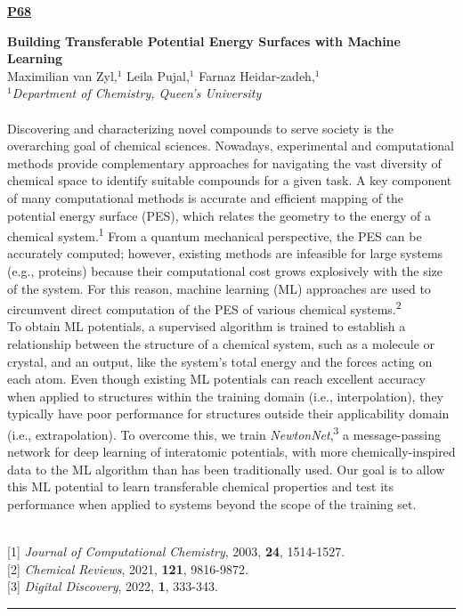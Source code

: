\documentclass[titlepage,oneside,openany,10pt]{book}
\newenvironment{posterabswref}[5] %
        {
        \newcommand{\posterref}{#5}
	\begin{flushright}
                \underline{\textbf{#4}}
        \end{flushright}
        \textbf{#1}\\%
        #2\\%
        \textit{#3}\\\\%
        }
        {
        \vspace{0.5cm}
        \\\noindent \posterref \\ \noindent\rule{15cm}{0.5pt}%
        }
\begin{document}
\newpage

\begin{posterabswref}
	{Building Transferable Potential Energy Surfaces with Machine Learning}
	{Maximilian van Zyl,$^{1}$ Leila Pujal,$^{1}$ Farnaz Heidar-zadeh,$^{1}$}
	{
	$^1$Department of Chemistry, Queen's University
	}
	{P68}
	{
	{[1]} \emph{Journal of Computational Chemistry}, 2003, \textbf{24}, 1514-1527.\\
	{[2]} \emph{Chemical Reviews}, 2021, \textbf{121}, 9816-9872.\\
	{[3]} \emph{Digital Discovery}, 2022, \textbf{1}, 333-343.
	}
	Discovering and characterizing novel compounds to serve society is the overarching goal of chemical sciences. Nowadays, experimental and computational methods provide complementary approaches for navigating the vast diversity of chemical space to identify suitable compounds for a given task. A key component of many computational methods is accurate and efficient mapping of the potential energy surface (PES), which relates the geometry to the energy of a chemical system.\textsuperscript{1} From a quantum mechanical perspective, the PES can be accurately computed; however, existing methods are infeasible for large systems (e.g., proteins) because their computational cost grows explosively with the size of the system. For this reason, machine learning (ML) approaches are used to circumvent direct computation of the PES of various chemical systems.\textsuperscript{2}\\To obtain ML potentials, a supervised algorithm is trained to establish a relationship between the structure of a chemical system, such as a molecule or crystal, and an output, like the system's total energy and the forces acting on each atom. Even though existing ML potentials can reach excellent accuracy when applied to structures within the training domain (i.e., interpolation), they typically have poor performance for structures outside their applicability domain (i.e., extrapolation). To overcome this, we train \emph{NewtonNet},\textsuperscript{3} a message-passing network for deep learning of interatomic potentials, with more chemically-inspired data to the ML algorithm than has been traditionally used. Our goal is to allow this ML potential to learn transferable chemical properties and test its performance when applied to systems beyond the scope of the training set.
	\label{Van zylM}
\end{posterabswref}
\end{document}
